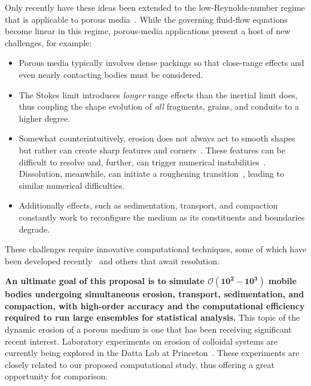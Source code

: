 \documentclass[11pt]{article}
\begin{document}
Only recently have these ideas been extended to the low-Reynolds-number regime that is applicable to porous media~\cite{mitchell2017generalized, Quaife2018}. While the governing fluid-flow equations become linear in this regime, porous-media applications present a host of new challenges, for example:
\begin{itemize}[noitemsep,topsep=0pt]
\item Porous media typically involves dense packings so that close-range effects and even nearly contacting bodies must be considered.

\item The Stokes limit introduces {\em longer} range effects than the inertial limit does, thus coupling the shape evolution of {\em all} fragments, grains, and conduits to a higher degree.

\item Somewhat counterintuitively, erosion does not always act to smooth shapes but rather can create sharp features and corners~\cite{Ristroph2012}. These features can be difficult to resolve and, further, can trigger numerical instabilities~\cite{Quaife2018}. Dissolution, meanwhile, can initiate a roughening transition~\cite{claudin2017dissolution}, leading to similar numerical difficulties.

\item Additionally effects, such as sedimentation, transport, and compaction constantly work to reconfigure the medium as its constituents and boundaries degrade.
\end{itemize}
These challenges require innovative computational techniques, some of which have been developed recently~\cite{Quaife2018} and others that await resolution. 

{\bf An ultimate goal of this proposal is to simulate $\boldsymbol{\mathcal{O}(10^2-10^3)}$ mobile bodies undergoing simultaneous erosion, transport, sedimentation, and compaction, with high-order accuracy and the computational efficiency required to run large ensembles for statistical analysis.} 
This topic of the dynamic erosion of a porous medium is one that has been receiving significant recent interest. Laboratory experiments on erosion of colloidal systems are currently being explored in the Datta Lab at Princeton~\cite{bizmark2019multiscale}. These experiments are closely related to our proposed computational study, thus offering a great opportunity for comparison.
\end{document}
